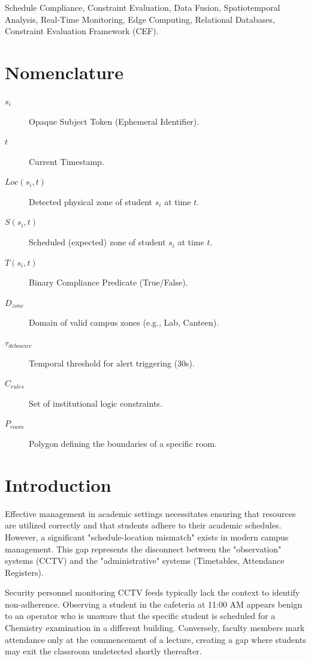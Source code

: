\documentclass[conference]{IEEEtran}
\begin{document}
\begin{IEEEkeywords}
Schedule Compliance, Constraint Evaluation, Data Fusion, Spatiotemporal Analysis, Real-Time Monitoring, Edge Computing, Relational Databases, Constraint Evaluation Framework (CEF).
\end{IEEEkeywords}

\section*{Nomenclature}
\begin{description}
    \item[$s_i$] Opaque Subject Token (Ephemeral Identifier).
    \item[$t$] Current Timestamp.
    \item[$Loc(s_i, t)$] Detected physical zone of student $s_i$ at time $t$.
    \item[$S(s_i, t)$] Scheduled (expected) zone of student $s_i$ at time $t$.
    \item[$T(s_i, t)$] Binary Compliance Predicate (True/False).
    \item[$D_{zone}$] Domain of valid campus zones (e.g., Lab, Canteen).
    \item[$\tau_{debounce}$] Temporal threshold for alert triggering (30s).
    \item[$C_{rules}$] Set of institutional logic constraints.
    \item[$P_{room}$] Polygon defining the boundaries of a specific room.
\end{description}

\section{Introduction}
Effective management in academic settings necessitates ensuring that resources are utilized correctly and that students adhere to their academic schedules. However, a significant "schedule-location mismatch" exists in modern campus management. This gap represents the disconnect between the "observation" systems (CCTV) and the "administrative" systems (Timetables, Attendance Registers).

Security personnel monitoring CCTV feeds typically lack the context to identify non-adherence. Observing a student in the cafeteria at 11:00 AM appears benign to an operator who is unaware that the specific student is scheduled for a Chemistry examination in a different building. Conversely, faculty members mark attendance only at the commencement of a lecture, creating a gap where students may exit the classroom undetected shortly thereafter.
\end{document}
